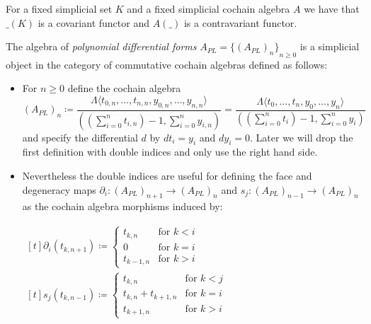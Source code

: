  \begin{Remark}
  For a fixed simplicial set $K$ and a fixed simplicial cochain algebra $A$ we have that $\_(K)$ is a covariant functor and
  $A(\_)$ is a contravariant functor.
 \end{Remark}

 \begin{Definition}
  The algebra of \emph{polynomial differential forms} $A_{PL} = {\lbrace (A_{PL})_n\rbrace}_{n \geq 0}$ is a
  simplicial object in the category of commutative cochain algebras defined as follows: \newline
  \begin{itemize}
   \item For $n \geq 0$ define the cochain algebra 
      $$(A_{PL})_n \coloneqq \frac{\Lambda \langle t_{0,n}, \dotsc, t_{n,n}, y_{0,n}, \dotsc, y_{n,n} \rangle}
      {((\sum_{i = 0}^n t_{i,n}) - 1, \sum_{i = 0}^n y_{i,n})}
      = \frac{\Lambda \langle t_0, \dotsc, t_n, y_0, \dotsc, y_n \rangle}
      {((\sum_{i = 0}^n t_i) - 1, \sum_{i = 0}^n y_i)} $$
      and specify the differential $d$ by $dt_i = y_i$ and $dy_i = 0$. Later we will drop the first definition with
      double indices and only use the right hand side.
   \item Nevertheless the double indices are useful for defining the face and degeneracy maps 
   $ \partial_i \colon (A_{PL})_{n+1} \to (A_{PL})_n$ and $ s_j \colon (A_{PL})_{n-1} \to (A_{PL})_n$
   as the cochain algebra morphisms induced by:
   
    \begin{center}
      \hfill
      $\!\begin{aligned}[t]
       \partial_i (t_{k,n+1}) \coloneqq \begin{cases}
                                      t_{k,n}  	&\text{for $k < i$} \\
                                      0		&\text{for $k = i$}\\
                                      t_{k-1,n} &\text{for $k > i$}
				      \end{cases}
      \end{aligned}$\hfill\hfill
      $\!\begin{aligned}[t]
       s_j (t_{k,n-1}) \coloneqq \begin{cases}
                                      t_{k,n}  			&\text{for $k < j$} \\
                                      t_{k,n} + t_{k+1,n}	&\text{for $k = i$}\\
                                      t_{k+1,n} 		&\text{for $k > i$}
				      \end{cases}
      \end{aligned}$\hfill
    \end{center}    
  \end{itemize}
 \end{Definition}

